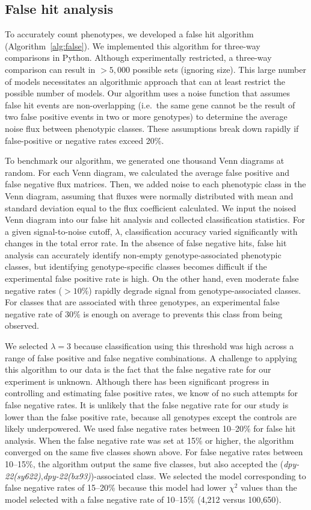 \documentclass[8pt, twocolumn]{article}
\newcommand{\gene}[1]{\mbox{\emph{#1}}}
\newcommand{\dpy}[1]{\gene{dpy-22#1}}
\newcommand{\bx}{\dpy{(bx93)}}
\newcommand{\sy}{\dpy{(sy622)}}
\begin{document}
\subsection*{False hit analysis}
To accurately count phenotypes, we developed a false hit algorithm
(Algorithm~\ref{alg:false}). We implemented this algorithm for three-way
comparisons in Python. Although experimentally restricted, a three-way
comparison can result in $>5,000$ possible sets (ignoring
size). This large number of models necessitates an algorithmic approach that can
at least restrict the possible number of models. Our algorithm uses a noise
function that assumes false hit events are non-overlapping (i.e.\ the same
gene cannot be the result of two false positive events in two or more genotypes)
to determine the average noise flux between phenotypic classes. These
assumptions break down rapidly if false-positive or negative rates exceed 20\%.

To benchmark our algorithm, we generated one thousand Venn diagrams at random.
For each Venn diagram, we calculated the average false positive and false
negative flux matrices. Then, we added noise to each phenotypic class in the
Venn diagram, assuming that fluxes were normally distributed with mean and
standard deviation equal to the flux coefficient calculated. We input the noised
Venn diagram into our false hit analysis and collected classification
statistics. For a given signal-to-noise cutoff, $\lambda$, classification
accuracy varied significantly with changes in the total error rate. In the
absence of false negative hits, false hit analysis can accurately identify
non-empty genotype-associated phenotypic classes, but identifying
genotype-specific classes becomes difficult if the experimental false positive
rate is high. On the other hand, even moderate false negative rates ($>10\%$)
rapidly degrade signal from genotype-associated classes. For classes that are
associated with three genotypes, an experimental false negative rate of 30\% is
enough on average to prevents this class from being observed.

We selected $\lambda=3$ because classification using this threshold was high
across a range of false positive and false negative combinations. A challenge to
applying this algorithm to our data is the fact that the false negative rate for
our experiment is unknown. Although there has been significant progress in
controlling and estimating false positive rates, we know of no such attempts for
false negative rates. It is unlikely that the false negative rate for our study
is lower than the false positive rate, because all genotypes except the controls
are likely underpowered. We used false negative rates between 10--20\% for false
hit analysis. When the false negative rate was set at 15\% or higher, the
algorithm converged on the same five classes shown above. For false negative
rates between 10--15\%, the algorithm output the same five classes, but also
accepted the (\sy{},\bx{})-associated class. We selected the model corresponding
to false negative rates of 15--20\% because this model had lower $\chi^2$ values
than the model selected with a false negative rate of 10--15\% (4,212 versus
100,650).
\end{document}
